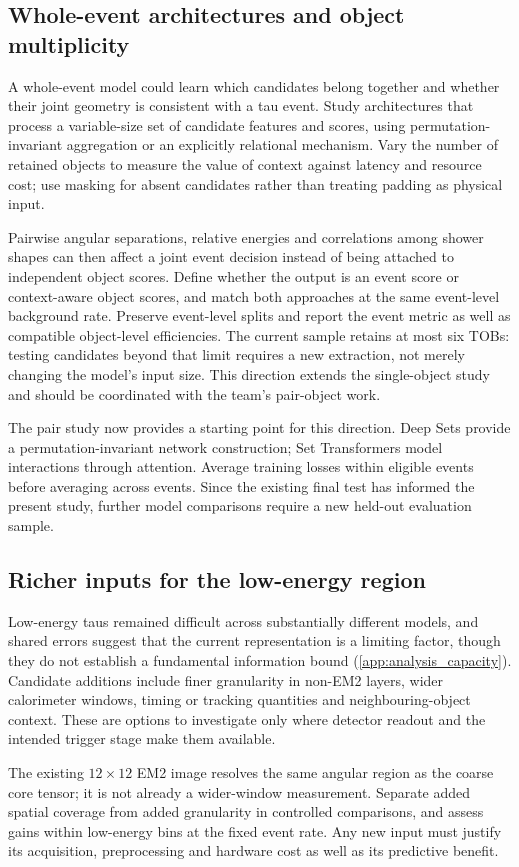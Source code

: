 \subsection{Whole-event architectures and object multiplicity}
A whole-event model could learn which candidates belong together and whether their joint geometry is consistent with a tau event. Study architectures that process a variable-size set of candidate features and scores, using permutation-invariant aggregation or an explicitly relational mechanism. Vary the number of retained objects to measure the value of context against latency and resource cost; use masking for absent candidates rather than treating padding as physical input.

Pairwise angular separations, relative energies and correlations among shower shapes can then affect a joint event decision instead of being attached to independent object scores. Define whether the output is an event score or context-aware object scores, and match both approaches at the same event-level background rate. Preserve event-level splits and report the event metric as well as compatible object-level efficiencies. The current sample retains at most six TOBs: testing candidates beyond that limit requires a new extraction, not merely changing the model's input size. This direction extends the single-object study and should be coordinated with the team's pair-object work.

The pair study now provides a starting point for this direction. Deep Sets
provide a permutation-invariant network construction\cite{zaheer2017deepsets};
Set Transformers model interactions through attention\cite{lee2019settransformer}.
Average training losses within eligible events before averaging across events.
Since the existing final test has informed the present study, further model
comparisons require a new held-out evaluation sample.

\subsection{Richer inputs for the low-energy region}
Low-energy taus remained difficult across substantially different models, and shared errors suggest that the current representation is a limiting factor, though they do not establish a fundamental information bound (\cref{app:analysis_capacity}). Candidate additions include finer granularity in non-EM2 layers, wider calorimeter windows, timing or tracking quantities and neighbouring-object context. These are options to investigate only where detector readout and the intended trigger stage make them available.

The existing $12\times12$ EM2 image resolves the same angular region as the coarse core tensor; it is not already a wider-window measurement. Separate added spatial coverage from added granularity in controlled comparisons, and assess gains within low-energy bins at the fixed event rate. Any new input must justify its acquisition, preprocessing and hardware cost as well as its predictive benefit.
